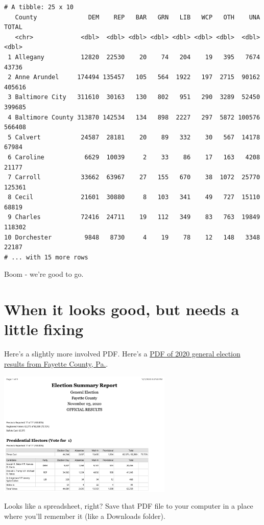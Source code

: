 \documentclass[
  letterpaper,
  DIV=11,
  numbers=noendperiod]{scrreprt}
\begin{document}
\begin{verbatim}
# A tibble: 25 x 10
   County              DEM    REP   BAR   GRN   LIB   WCP   OTH    UNA  TOTAL
   <chr>             <dbl>  <dbl> <dbl> <dbl> <dbl> <dbl> <dbl>  <dbl>  <dbl>
 1 Allegany          12820  22530    20    74   204    19   395   7674  43736
 2 Anne Arundel     174494 135457   105   564  1922   197  2715  90162 405616
 3 Baltimore City   311610  30163   130   802   951   290  3289  52450 399685
 4 Baltimore County 313870 142534   134   898  2227   297  5872 100576 566408
 5 Calvert           24587  28181    20    89   332    30   567  14178  67984
 6 Caroline           6629  10039     2    33    86    17   163   4208  21177
 7 Carroll           33662  63967    27   155   670    38  1072  25770 125361
 8 Cecil             21601  30880     8   103   341    49   727  15110  68819
 9 Charles           72416  24711    19   112   349    83   763  19849 118302
10 Dorchester         9848   8730     4    19    78    12   148   3348  22187
# ... with 15 more rows
\end{verbatim}

Boom - we're good to go.

\hypertarget{when-it-looks-good-but-needs-a-little-fixing}{%
\section{When it looks good, but needs a little
fixing}\label{when-it-looks-good-but-needs-a-little-fixing}}

Here's a slightly more involved PDF. Here's a
\href{https://raw.githubusercontent.com/openelections/openelections-sources-pa/master/2020/general/Fayette\%20PA\%202020\%20General\%20Summary.pdf}{PDF
of 2020 general election results from Fayette County, Pa.}.

\includegraphics[width=3.27in,height=\textheight]{./images/fayette_1.png}

Looks like a spreadsheet, right? Save that PDF file to your computer in
a place where you'll remember it (like a Downloads folder).
\end{document}

